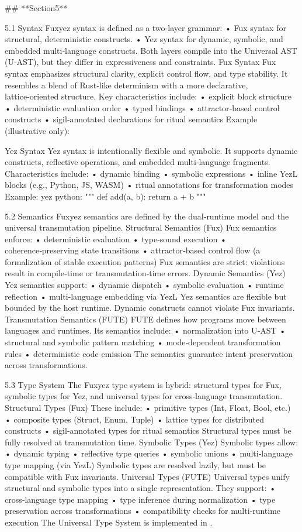 ## **Section5**

5.1 Syntax
Fuxyez syntax is defined as a two‑layer grammar:
• 	Fux syntax for structural, deterministic constructs.
• 	Yez syntax for dynamic, symbolic, and embedded multi‑language constructs.
Both layers compile into the Universal AST (U‑AST), but they differ in expressiveness and constraints.
Fux Syntax
Fux syntax emphasizes structural clarity, explicit control flow, and type stability. It resembles a blend of Rust‑like determinism with a more declarative, lattice‑oriented structure.
Key characteristics include:
• 	explicit block structure
• 	deterministic evaluation order
• 	typed bindings
• 	attractor‑based control constructs
• 	sigil‑annotated declarations for ritual semantics
Example (illustrative only):

Yez Syntax
Yez syntax is intentionally flexible and symbolic. It supports dynamic constructs, reflective operations, and embedded multi‑language fragments.
Characteristics include:
• 	dynamic binding
• 	symbolic expressions
• 	inline YezL blocks (e.g., Python, JS, WASM)
• 	ritual annotations for transformation modes
Example:
yez {
    python: """
    def add(a, b): return a + b
    """
}

5.2 Semantics
Fuxyez semantics are defined by the dual‑runtime model and the universal transmutation pipeline.
Structural Semantics (Fux)
Fux semantics enforce:
• 	deterministic evaluation
• 	type‑sound execution
• 	coherence‑preserving state transitions
• 	attractor‑based control flow (a formalization of stable execution patterns)
Fux semantics are strict: violations result in compile‑time or transmutation‑time errors.
Dynamic Semantics (Yez)
Yez semantics support:
• 	dynamic dispatch
• 	symbolic evaluation
• 	runtime reflection
• 	multi‑language embedding via YezL
Yez semantics are flexible but bounded by the host runtime. Dynamic constructs cannot violate Fux invariants.
Transmutation Semantics (FUTE)
FUTE defines how programs move between languages and runtimes. Its semantics include:
• 	normalization into U‑AST
• 	structural and symbolic pattern matching
• 	mode‑dependent transformation rules
• 	deterministic code emission
The semantics guarantee intent preservation across transformations.

5.3 Type System
The Fuxyez type system is hybrid: structural types for Fux, symbolic types for Yez, and universal types for cross‑language transmutation.
Structural Types (Fux)
These include:
• 	primitive types (Int, Float, Bool, etc.)
• 	composite types (Struct, Enum, Tuple)
• 	lattice types for distributed constructs
• 	sigil‑annotated types for ritual semantics
Structural types must be fully resolved at transmutation time.
Symbolic Types (Yez)
Symbolic types allow:
• 	dynamic typing
• 	reflective type queries
• 	symbolic unions
• 	multi‑language type mapping (via YezL)
Symbolic types are resolved lazily, but must be compatible with Fux invariants.
Universal Types (FUTE)
Universal types unify structural and symbolic types into a single representation. They support:
• 	cross‑language type mapping
• 	type inference during normalization
• 	type preservation across transformations
• 	compatibility checks for multi‑runtime execution
The Universal Type System is implemented in .

